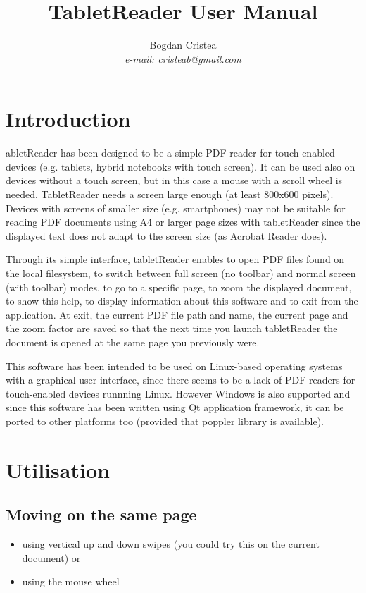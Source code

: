 \documentclass[journal,12pt]{IEEEtran}
\begin{document}
\title{TabletReader User Manual}
\author{Bogdan Cristea\\\textit{e-mail: cristeab@gmail.com}}

\maketitle

\section{Introduction}

abletReader has been designed to be a simple PDF reader for touch-enabled devices (e.g. tablets, hybrid notebooks with touch screen). It can be used also on devices without a touch screen, but in this case a mouse with a scroll wheel is needed. TabletReader needs a screen large enough (at least 800x600 pixels). Devices with screens of smaller size (e.g. smartphones) may not be suitable for reading PDF documents using A4 or larger page sizes with tabletReader since the displayed text does not adapt to the screen size (as Acrobat Reader does).

Through its simple interface, tabletReader enables to open PDF files found on the local filesystem, to switch between full screen (no toolbar) and normal screen (with toolbar) modes, to go to a specific page, to zoom the displayed document, to show this help, to display information about this software and to exit from the application. At exit, the current PDF file path and name, the current page and the zoom factor are saved so that the next time you launch tabletReader the document is opened at the same page you previously were.

This software has been intended to be used on Linux-based operating systems with a graphical user interface, since there seems to be a lack of PDF readers for touch-enabled devices runnning Linux. However Windows is also supported and since this software has been written using Qt application framework, it can be ported to other platforms too (provided that poppler library is available).

\newpage

\section{Utilisation}

\subsection{Moving on the same page}
\begin{itemize}
 \item using vertical up and down swipes (you could try this on the current document) or
 \item using the mouse wheel
\end{itemize}
\end{document}
